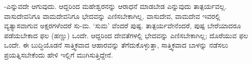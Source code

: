 -ಎನ್ನುವದೇ ಆಗುವುದು. ಆದ್ದರಿಂದ ಮಹೇಶ್ವರನನ್ನು ಆರಾಧನೆ ಮಾಡಬೇಡ ಎನ್ನುವುದು ತಾತ್ಪರ್ಯವಲ್ಲ. ವಾಸುದೇವನಿಗೂ ವಾಮದೇವನಿಗೂ ಭೇದವನ್ನು ಎಣಿಸಬೇಕಾಗಿಲ್ಲ. ವಾಸುದೇವ, ವಾಮದೇವ ಇವರಲ್ಲಿ ವ್ಯತ್ಯಾಸವಾಗುವ ಅಕ್ಷರಗಳೆಂದರೆ ಸು-ಮ. `ಸುಮ' ವೆಂದರೆ ಪುಷ್ಪ. ತಾತ್ಪರ್ಯವೇನೆಂದರೆ, ಪುಷ್ಪ ಬೇರೆಯಾದರೂ ಪಡೆಯಬೇಕಾದ ಫಲ (ಹಣ್ಣು) ಒಂದೇ. ಆದ್ದರಿಂದ ದೇವತೆಗಳಲ್ಲಿ ಭೇದವನ್ನು ಎಣಿಸಬೇಕಾಗಿಲ್ಲ; ದೊರೆಯುವ ಫಲ ಒಂದೇ. ಈ ಬುದ್ಧಿಯೊಡನೆ ಸಾತ್ತ್ವಿಕವಾದ ಆಹಾರವನ್ನು ತೆಗೆದುಕೊಳ್ಳುತ್ತಾ, ಸಾತ್ತ್ವಿಕವಾದ ಬಾಳನ್ನು ನಡೆಸಲು ಪ್ರಯತ್ನಿಸಬೇಕೆಂದು ಹೇಳಿ ಇಲ್ಲಿಗೆ ಮುಗಿಸುತ್ತಿದ್ದೇನೆ.
















































